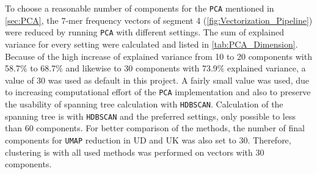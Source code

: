 \vspace{1em}

To choose a reasonable number of components for the \texttt{PCA} mentioned in \autoref{sec:PCA}, the 7-mer frequency vectors of segment 4 (\autoref{fig:Vectorization_Pipeline}) were reduced by running \texttt{PCA} with different settings. The sum of explained variance for every setting were calculated and listed in \autoref{tab:PCA_Dimension}. Because of the high increase of explained variance from 10 to 20 components with 58.7\% to 68.7\% and likewise to 30 components with 73.9\% explained variance, a value of 30 was used as default in this project. A fairly small value was used, due to increasing computational effort of the \texttt{PCA} implementation and also to preserve the usability of spanning tree calculation with \texttt{HDBSCAN}. Calculation of the spanning tree is with \texttt{HDBSCAN} and the preferred settings, only possible to less than 60 components. For better comparison of the methods, the number of final components for \texttt{UMAP} reduction in UD and UK was also set to 30. Therefore, clustering is with all used methods was performed on vectors with 30 components.

\begin{table}[!hbt]
    \centering
    \caption[Explained variance by different PCA settings]{\textbf{Explained variance by different PCA settings.} The explained variance of specific \texttt{PCA} settings used on the 7-mer frequency vectors of segment 4. A result of 0.587 as for 10 components represents 58.7\% of the variance is explained by the first 10 components of the vector. The more components are extracted the lower the increase in additional explained variance \autocite{pearson_liii_1901}.}
    \label{tab:PCA_Dimension}
\end{table}

